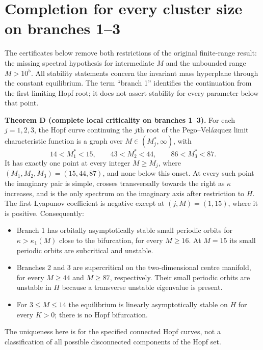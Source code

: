 \section{Completion for every cluster size on branches 1--3}\label{sec:allm}

The certificates below remove both restrictions of the original finite-range result:
the missing spectral hypothesis for intermediate $M$ and the unbounded range $M>10^5$.
All stability statements concern the invariant mass hyperplane through the constant equilibrium.
The term ``branch 1'' identifies the continuation from the first limiting Hopf root; it does not
assert stability for every parameter below that point.

\textbf{Theorem D (complete local criticality on branches 1--3).}
For each $j=1,2,3$, the Hopf curve continuing the $j$th root of the Pego--Velázquez
limit characteristic function is a graph over $M\in(M_j^*,\infty)$, with
\[
 14<M_1^*<15,\qquad43<M_2^*<44,\qquad86<M_3^*<87.
\]
It has exactly one point at every integer $M\ge M_j$, where $(M_1,M_2,M_3)=(15,44,87)$,
and none below this onset. At every such point the imaginary pair is simple, crosses
transversally towards the right as $\kappa$ increases, and is the only spectrum on the
imaginary axis after restriction to $H$. The first Lyapunov coefficient is negative
except at $(j,M)=(1,15)$, where it is positive. Consequently:
\begin{itemize}
\item Branch 1 has orbitally asymptotically stable small periodic orbits for
      $\kappa>\kappa_1(M)$ close to the bifurcation, for every $M\ge16$.
      At $M=15$ its small periodic orbits are subcritical and unstable.
\item Branches 2 and 3 are supercritical on the two-dimensional centre manifold,
      for every $M\ge44$ and $M\ge87$, respectively. Their small periodic orbits
      are unstable in $H$ because a transverse unstable eigenvalue is present.
\item For $3\le M\le14$ the equilibrium is linearly asymptotically stable on $H$
      for every $K>0$; there is no Hopf bifurcation.
\end{itemize}
The uniqueness here is for the specified connected Hopf curves, not a classification
of all possible disconnected components of the Hopf set.


